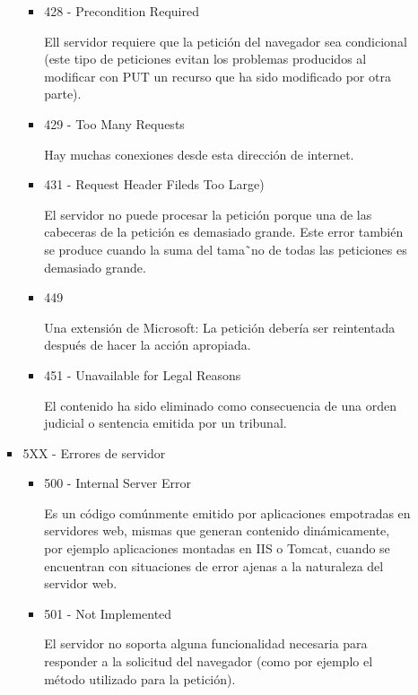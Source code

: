 \documentclass[a4paper,10pt]{article}
\begin{document}
\begin{enumerate}
\begin{enumerate}
\begin{itemize}
\begin{itemize}
                            \item 428 - Precondition Required

                            Ell servidor requiere que la petición del navegador sea condicional (este tipo de peticiones evitan los problemas producidos al modificar con PUT un recurso que ha sido modificado por otra parte).

                            \item 429 - Too Many Requests

                            Hay muchas conexiones desde esta dirección de internet.

                            \item 431 - Request Header Fileds Too Large)

                            El servidor no puede procesar la petición porque una de las cabeceras de la petición es demasiado grande. Este error también se produce cuando la suma del tama˜no de todas las peticiones es demasiado grande.

                            \item 449

                            Una extensión de Microsoft: La petición debería ser reintentada después de hacer la acción apropiada.

                            \item 451 - Unavailable for Legal Reasons

                            El contenido ha sido eliminado como consecuencia de una orden judicial o sentencia emitida por un tribunal.
                        \end{itemize}

                    \item 5XX - Errores de servidor
                        \begin{itemize}
                            \item 500 - Internal Server Error

                            Es un código comúnmente emitido por aplicaciones empotradas en servidores web, mismas que generan contenido dinámicamente, por ejemplo aplicaciones montadas en IIS o Tomcat, cuando se encuentran con situaciones de error ajenas a la naturaleza del servidor web.

                            \item 501 - Not Implemented

                            El servidor no soporta alguna funcionalidad necesaria para responder a la solicitud del navegador (como por ejemplo el método utilizado para la petición).


\end{itemize}
\end{itemize}
\end{enumerate}
\end{enumerate}
\end{document}
